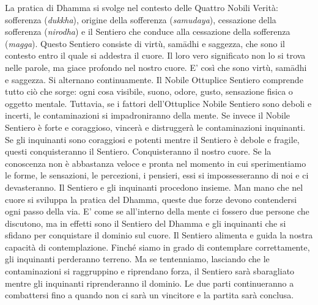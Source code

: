 La pratica di Dhamma si svolge nel contesto delle Quattro Nobili Verità:
sofferenza (\emph{dukkha}), origine della sofferenza (\emph{samudaya}),
cessazione della sofferenza (\emph{nirodha}) e il Sentiero che conduce
alla cessazione della sofferenza (\emph{magga}). Questo Sentiero
consiste di virtù, samādhi e saggezza, che sono il contesto entro il
quale si addestra il cuore. Il loro vero significato non lo si trova
nelle parole, ma giace profondo nel nostro cuore. E' così che sono
virtù, samādhi e saggezza. Si alternano continuamente. Il Nobile
Ottuplice Sentiero comprende tutto ciò che sorge: ogni cosa visibile,
suono, odore, gusto, sensazione fisica o oggetto mentale. Tuttavia, se i
fattori dell'Ottuplice Nobile Sentiero sono deboli e incerti, le
contaminazioni si impadroniranno della mente. Se invece il Nobile
Sentiero è forte e coraggioso, vincerà e distruggerà le contaminazioni
inquinanti. Se gli inquinanti sono coraggiosi e potenti mentre il
Sentiero è debole e fragile, questi conquisteranno il Sentiero.
Conquisteranno il nostro cuore. Se la conoscenza non è abbastanza veloce
e pronta nel momento in cui sperimentiamo le forme, le sensazioni, le
percezioni, i pensieri, essi si impossesseranno di noi e ci
devasteranno. Il Sentiero e gli inquinanti procedono insieme. Man mano
che nel cuore si sviluppa la pratica del Dhamma, queste due forze devono
contendersi ogni passo della via. E' come se all'interno della mente ci
fossero due persone che discutono, ma in effetti sono il Sentiero del
Dhamma e gli inquinanti che si sfidano per conquistare il dominio sul
cuore. Il Sentiero alimenta e guida la nostra capacità di
contemplazione. Finché siamo in grado di contemplare correttamente, gli
inquinanti perderanno terreno. Ma se tentenniamo, lasciando che le
contaminazioni si raggruppino e riprendano forza, il Sentiero sarà
sbaragliato mentre gli inquinanti riprenderanno il dominio. Le due parti
continueranno a combattersi fino a quando non ci sarà un vincitore e la
partita sarà conclusa.

